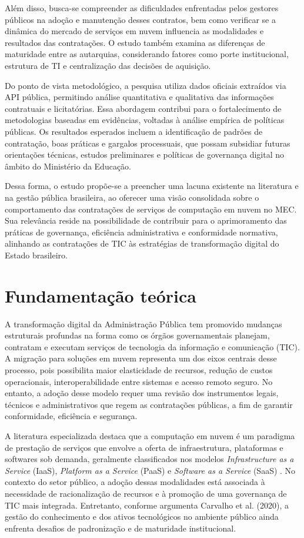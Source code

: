 \documentclass[a4paper, 12pt,brazil]{article}
\begin{document}
Além disso, busca-se compreender as dificuldades enfrentadas pelos gestores públicos na adoção e manutenção desses contratos, bem como verificar se a dinâmica do mercado de serviços em nuvem influencia as modalidades e resultados das contratações. O estudo também examina as diferenças de maturidade entre as autarquias, considerando fatores como porte institucional, estrutura de TI e centralização das decisões de aquisição.

Do ponto de vista metodológico, a pesquisa utiliza dados oficiais extraídos via API pública, permitindo análise quantitativa e qualitativa das informações contratuais e licitatórias. Essa abordagem contribui para o fortalecimento de metodologias baseadas em evidências, voltadas à análise empírica de políticas públicas. Os resultados esperados incluem a identificação de padrões de contratação, boas práticas e gargalos processuais, que possam subsidiar futuras orientações técnicas, estudos preliminares e políticas de governança digital no âmbito do Ministério da Educação.

Dessa forma, o estudo propõe-se a preencher uma lacuna existente na literatura e na gestão pública brasileira, ao oferecer uma visão consolidada sobre o comportamento das contratações de serviços de computação em nuvem no MEC. Sua relevância reside na possibilidade de contribuir para o aprimoramento das práticas de governança, eficiência administrativa e conformidade normativa, alinhando as contratações de TIC às estratégias de transformação digital do Estado brasileiro.


\section{Fundamentação teórica}

A transformação digital da Administração Pública tem promovido mudanças estruturais profundas na forma como os órgãos governamentais planejam, contratam e executam serviços de tecnologia da informação e comunicação (TIC). A migração para soluções em nuvem representa um dos eixos centrais desse processo, pois possibilita maior elasticidade de recursos, redução de custos operacionais, interoperabilidade entre sistemas e acesso remoto seguro. No entanto, a adoção desse modelo requer uma revisão dos instrumentos legais, técnicos e administrativos que regem as contratações públicas, a fim de garantir conformidade, eficiência e segurança.

A literatura especializada destaca que a computação em nuvem é um paradigma de prestação de serviços que envolve a oferta de infraestrutura, plataformas e softwares sob demanda, geralmente classificados nos modelos \textit{Infrastructure as a Service} (IaaS), \textit{Platform as a Service} (PaaS) e \textit{Software as a Service} (SaaS) \cite{mell2011nist}. No contexto do setor público, a adoção dessas modalidades está associada à necessidade de racionalização de recursos e à promoção de uma governança de TIC mais integrada. Entretanto, conforme argumenta Carvalho et al. (2020), a gestão do conhecimento e dos ativos tecnológicos no ambiente público ainda enfrenta desafios de padronização e de maturidade institucional.
\end{document}
